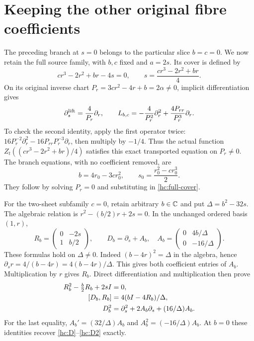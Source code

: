 \section{Keeping the other original fibre coefficients}
The preceding branch at $s=0$ belongs to the particular slice $b=c=0$.
We now retain the full source family, with $b,c$ fixed and $a=2s$.
Its cover is defined by
\begin{equation}
cr^3-2r^2+br-4s=0,\qquad
s=\frac{cr^3-2r^2+br}{4}.
\label{hc:full-cover}
\end{equation}
On its original inverse chart $P_r=3cr^2-4r+b=2\alpha\ne0$,
implicit differentiation gives
\begin{equation}
\partial_s^{\rm lift}=\frac4{P_r}\partial_r,\qquad
L_{b,c}=-\frac4{P_r^2}\partial_r^2
                  +\frac{4P_{rr}}{P_r^3}\partial_r.
\label{hc:full-generator}
\end{equation}
To check the second identity, apply the first operator twice:
$16P_r^{-2}\partial_r^2-16P_{rr}P_r^{-3}\partial_r$,
then multiply by $-1/4$. Thus the actual function
$Z_t((cr^3-2r^2+br)/4)$ satisfies this exact transported equation
on $P_r\ne0$. The branch equations, with no coefficient removed, are
\begin{equation}
b=4r_0-3cr_0^2,\qquad s_0=\frac{r_0^2-cr_0^3}{2}.
\label{hc:branch-family}
\end{equation}
They follow by solving $P_r=0$ and substituting in \eqref{hc:full-cover}.

For the two-sheet subfamily $c=0$, retain arbitrary $b\in\mathbb C$ and put
$\Delta=b^2-32s$. The algebraic relation is
$r^2-(b/2)r+2s=0$. In the unchanged ordered basis $(1,r)$,
\begin{equation}
R_b=\begin{pmatrix}0&-2s\\1&b/2\end{pmatrix},\qquad
D_b=\partial_s+A_b,\quad
A_b=\begin{pmatrix}0&4b/\Delta\\0&-16/\Delta\end{pmatrix}.
\label{hc:b-matrix}
\end{equation}
These formulas hold on $\Delta\ne0$. Indeed
$(b-4r)^2=\Delta$ in the algebra, hence
$\partial_s r=4/(b-4r)=4(b-4r)/\Delta$.
This gives both coefficient entries of $A_b$. Multiplication by $r$
gives $R_b$. Direct differentiation and multiplication then prove
\begin{align}
R_b^2-\tfrac b2R_b+2sI&=0,\notag\\
[D_b,R_b]&=4(bI-4R_b)/\Delta,\notag\\
D_b^2&=\partial_s^2+2A_b\partial_s+(16/\Delta)A_b.
\label{hc:b-identities}
\end{align}
For the last equality, $A_b'=(32/\Delta)A_b$ and
$A_b^2=(-16/\Delta)A_b$. At $b=0$ these identities recover
\eqref{hc:D}--\eqref{hc:D2} exactly.

